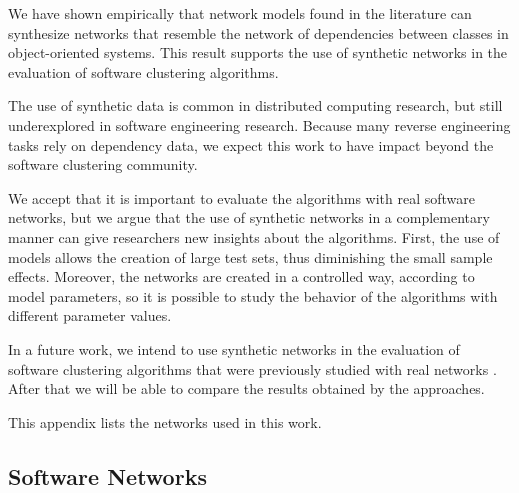 We have shown empirically that network models found in the literature can
synthesize networks that resemble the network of dependencies between classes in
object-oriented systems. This result supports the use of synthetic networks in
the evaluation of software clustering algorithms.

The use of synthetic data is common in distributed computing research, but still
underexplored in software engineering research. Because many reverse engineering
tasks rely on dependency data, we expect this work to have impact beyond the
software clustering community.


We accept that it is important to evaluate the algorithms with real software
networks, but we argue that the use of synthetic networks in a complementary
manner can give researchers new insights about the algorithms. First, the use of
models allows the creation of large test sets, thus diminishing the small sample
effects. Moreover, the networks are created in a controlled way, according to
model parameters, so it is possible to study the behavior of the algorithms with
different parameter values.

In a future work, we intend to use synthetic networks in the evaluation of
software clustering algorithms that were previously studied with real networks
\cite{Wu2005}. After that we will be able to compare the results obtained by
the approaches.

\appendix %

This appendix lists the networks used in this work.

\subsection{Software Networks}

